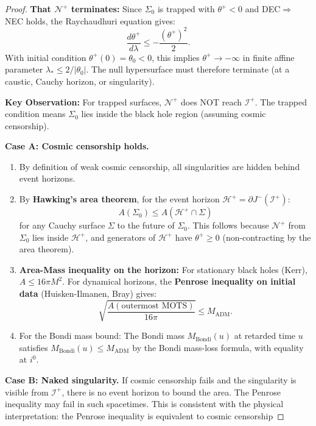 \begin{proof}
\textbf{That $\mathcal{N}^+$ terminates:}
Since $\Sigma_0$ is trapped with $\theta^+ < 0$ and DEC$\Rightarrow$NEC holds, the Raychaudhuri equation gives:
\begin{equation}
    \frac{d\theta^+}{d\lambda} \leq -\frac{(\theta^+)^2}{2}.
\end{equation}
With initial condition $\theta^+(0) = \theta_0 < 0$, this implies $\theta^+ \to -\infty$ in finite affine parameter $\lambda_* \leq 2/|\theta_0|$. The null hypersurface must therefore terminate (at a caustic, Cauchy horizon, or singularity).

\textbf{Key Observation:} For trapped surfaces, $\mathcal{N}^+$ does NOT reach $\mathscr{I}^+$. The trapped condition means $\Sigma_0$ lies inside the black hole region (assuming cosmic censorship).

\textbf{Case A: Cosmic censorship holds.}
\begin{enumerate}
    \item By definition of weak cosmic censorship, all singularities are hidden behind event horizons.
    \item By \textbf{Hawking's area theorem}, for the event horizon $\mathcal{H}^+ = \partial J^-(\mathscr{I}^+)$:
    \begin{equation}
        A(\Sigma_0) \leq A(\mathcal{H}^+ \cap \Sigma)
    \end{equation}
    for any Cauchy surface $\Sigma$ to the future of $\Sigma_0$. This follows because $\mathcal{N}^+$ from $\Sigma_0$ lies inside $\mathcal{H}^+$, and generators of $\mathcal{H}^+$ have $\theta^+ \geq 0$ (non-contracting by the area theorem).
    
    \item \textbf{Area-Mass inequality on the horizon:} For stationary black holes (Kerr), $A \leq 16\pi M^2$. For dynamical horizons, the \textbf{Penrose inequality on initial data} (Huisken-Ilmanen, Bray) gives:
    \begin{equation}
        \sqrt{\frac{A(\text{outermost MOTS})}{16\pi}} \leq M_{\mathrm{ADM}}.
    \end{equation}
    
    \item For the Bondi mass bound: The Bondi mass $M_{\mathrm{Bondi}}(u)$ at retarded time $u$ satisfies $M_{\mathrm{Bondi}}(u) \leq M_{\mathrm{ADM}}$ by the Bondi mass-loss formula, with equality at $i^0$.
\end{enumerate}

\textbf{Case B: Naked singularity.}
If cosmic censorship fails and the singularity is visible from $\mathscr{I}^+$, there is no event horizon to bound the area. The Penrose inequality may fail in such spacetimes. This is consistent with the physical interpretation: the Penrose inequality is equivalent to cosmic censorship \qedhere
\end{proof}

